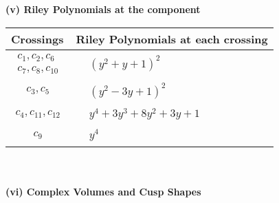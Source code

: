 \documentclass[1p]{elsarticle_modified}
\theoremstyle{definition}
\begin{document}
\newpage\renewcommand{\arraystretch}{1}
\flushleft \textbf{(v) Riley Polynomials at the component}\newline \\
\begin{tabular}{m{50pt}|m{274pt}}
Crossings & \hspace{64pt}Riley Polynomials at each crossing \\
\hline $$\begin{aligned}c_{1},c_{2},c_{6}\\c_{7},c_{8},c_{10}\end{aligned}$$&$\begin{aligned}
&(y^2+y+1)^2
\end{aligned}$\\
\hline $$\begin{aligned}c_{3},c_{5}\end{aligned}$$&$\begin{aligned}
&(y^2-3 y+1)^2
\end{aligned}$\\
\hline $$\begin{aligned}c_{4},c_{11},c_{12}\end{aligned}$$&$\begin{aligned}
&y^4+3 y^3+8 y^2+3 y+1
\end{aligned}$\\
\hline $$\begin{aligned}c_{9}\end{aligned}$$&$\begin{aligned}
&y^4
\end{aligned}$\\
\hline
\end{tabular}\\~\\
\newpage\flushleft \textbf{(vi) Complex Volumes and Cusp Shapes}
\end{document}
